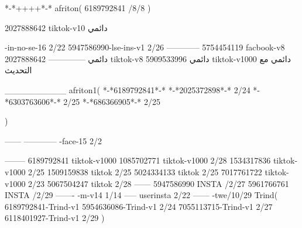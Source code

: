 *-*++++*-*
afriton(
6189792841 /8/8
)

2027888642 tiktok-v10
دائمي

-in-no-se-16 2/22
5947586990-lse-ins-v1 2/26
------------
5754454119 facbook-v8
دائمي
--------------
2027888642 tiktok-v8
دائمي
5909533996 tiktok-v1000
دائمي مع التحديث

__________
afriton1(
*-*6189792841*-*
*-*2025372898*-* 2/24
*-*6303763606*-* 2/25
*-*686366905*-* 2/25

)


------
------------
-face-15 2/2

--------
6189792841 tiktok-v1000
1085702771 tiktok-v1000 2/28
1534317836 tiktok-v1000 2/25
1509159838 tiktok 2/25
5024334133 tiktok 2/25
7017761722 tiktok-v1000 2/23
5067504247 tiktok 2/28
------
5947586990 INSTA /2/27
5961766761 INSTA /2/29
-------
-m-v14 1/14
-----
userinsta 2/22
------
-twe/10/29
Trind(
6189792841-Trind-v1 
5954636086-Trind-v1 2/24
7055113715-Trind-v1 2/27
6118401927-Trind-v1 2/29
)
